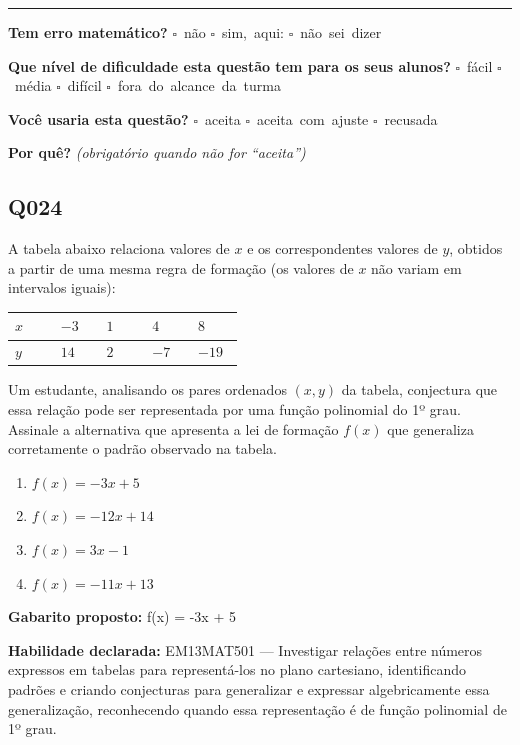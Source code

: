 \documentclass[11pt,a4paper]{article}
\begin{document}
\noindent\rule{\linewidth}{0.4pt}
\textbf{Tem erro matemático?}\quad
\mbox{$\square$~não} \quad \mbox{$\square$~sim, aqui:} \underline{\hspace{5cm}}
\quad \mbox{$\square$~não sei dizer}

\textbf{Que nível de dificuldade esta questão tem para os seus alunos?}\quad
\mbox{$\square$~fácil} \quad \mbox{$\square$~média} \quad
\mbox{$\square$~difícil} \quad \mbox{$\square$~fora do alcance da turma}

\textbf{Você usaria esta questão?}\quad
\mbox{$\square$~aceita} \quad \mbox{$\square$~aceita com ajuste} \quad
\mbox{$\square$~recusada}

\textbf{Por quê?} \emph{(obrigatório quando não for ``aceita'')}

\underline{\hspace{\linewidth}}

\underline{\hspace{\linewidth}}
\vspace{0.6em}

\begin{samepage}
\subsection*{Q024}
A tabela abaixo relaciona valores de $x$ e os correspondentes valores de $y$, obtidos a partir de uma mesma regra de formação (os valores de $x$ não variam em intervalos iguais):

\begin{center}
\begin{tabular}{|p{0.172\linewidth}|p{0.172\linewidth}|p{0.172\linewidth}|p{0.172\linewidth}|p{0.172\linewidth}|}
\hline
\textbf{$x$} & \textbf{$-3$} & \textbf{$1$} & \textbf{$4$} & \textbf{$8$} \\
\hline
$y$ & $14$ & $2$ & $-7$ & $-19$ \\
\hline
\end{tabular}
\end{center}

Um estudante, analisando os pares ordenados $(x,y)$ da tabela, conjectura que essa relação pode ser representada por uma função polinomial do 1º grau. Assinale a alternativa que apresenta a lei de formação $f(x)$ que generaliza corretamente o padrão observado na tabela.
\begin{enumerate}[label=(\alph*),nosep,leftmargin=*]
\item $f(x) = -3x + 5$
\item $f(x) = -12x + 14$
\item $f(x) = 3x - 1$
\item $f(x) = -11x + 13$
\end{enumerate}

\textbf{Gabarito proposto:} f(x) = -3x + 5

\textbf{Habilidade declarada:} EM13MAT501 --- Investigar relações entre números expressos em tabelas para representá-los no plano cartesiano, identificando padrões e criando conjecturas para generalizar e expressar algebricamente essa generalização, reconhecendo quando essa representação é de função polinomial de 1º grau.
\end{samepage}
\end{document}
